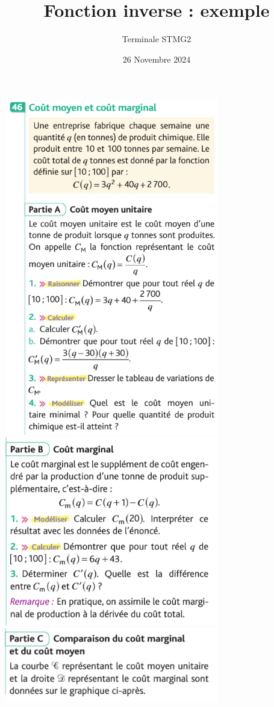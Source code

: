 \documentclass{article}
\title{Fonction inverse : exemple}
\author{Terminale STMG2}
\date{26 Novembre 2024}
\begin{document}
\maketitle
\begin{center}
    
    \includegraphics[width=0.7\textwidth]{Exercice_1.png}
    \includegraphics[width=0.7\textwidth]{Exercice_2.png}
    \includegraphics[width=0.7\textwidth]{Exercice_3.png}

\end{center}
\end{document}
